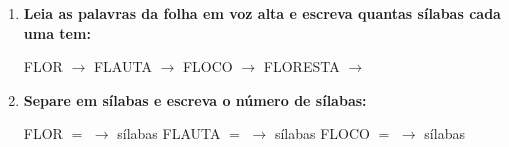 \begin{exercicio}
\begin{enumerate}[resume]
  \item \textbf{Leia as palavras da folha em voz alta e escreva quantas sílabas cada uma tem:}

  \begin{center}
  FLOR $\rightarrow$ \underline{\hspace{1cm}} \quad FLAUTA $\rightarrow$ \underline{\hspace{1cm}} \quad FLOCO $\rightarrow$ \underline{\hspace{1cm}} \quad FLORESTA $\rightarrow$ \underline{\hspace{1cm}}
  \end{center}

  \item \textbf{Separe em sílabas e escreva o número de sílabas:}
  \begin{center}
  FLOR $=$ \underline{\hspace{1.2cm}} $\rightarrow$ \underline{\hspace{0.8cm}} sílabas \quad FLAUTA $=$ \underline{\hspace{1.2cm}} $\rightarrow$ \underline{\hspace{0.8cm}} sílabas \quad FLOCO $=$ \underline{\hspace{1.2cm}} $\rightarrow$ \underline{\hspace{0.8cm}} sílabas
  \end{center}

\end{enumerate}

\end{exercicio}



